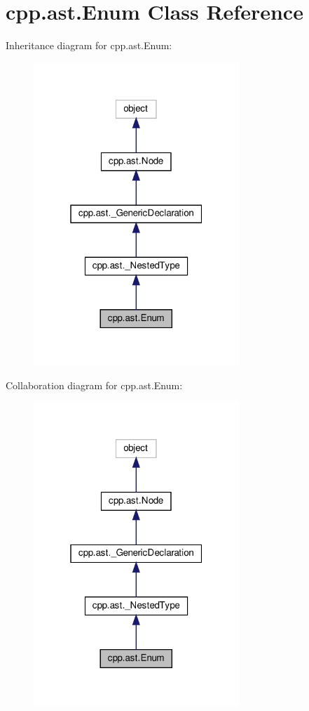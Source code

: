 \hypertarget{classcpp_1_1ast_1_1_enum}{}\section{cpp.\+ast.\+Enum Class Reference}
\label{classcpp_1_1ast_1_1_enum}


Inheritance diagram for cpp.\+ast.\+Enum\+:
\nopagebreak
\begin{figure}[H]
\begin{center}
\leavevmode
\includegraphics[width=220pt]{classcpp_1_1ast_1_1_enum__inherit__graph}
\end{center}
\end{figure}


Collaboration diagram for cpp.\+ast.\+Enum\+:
\nopagebreak
\begin{figure}[H]
\begin{center}
\leavevmode
\includegraphics[width=220pt]{classcpp_1_1ast_1_1_enum__coll__graph}
\end{center}
\end{figure}
